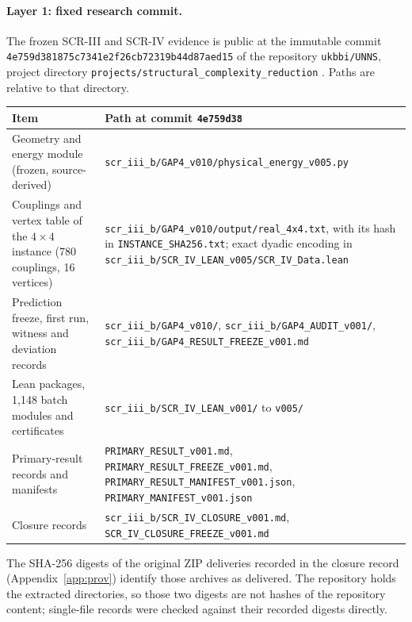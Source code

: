 \documentclass[11pt,a4paper]{article}
\theoremstyle{plain}
\theoremstyle{definition}
\theoremstyle{remark}
\newcommand{\lean}[1]{\nolinkurl{#1}}
\begin{document}
\paragraph{Layer 1: fixed research commit.} The frozen SCR-III and SCR-IV evidence is public at the immutable commit \texttt{4e759d381875c7341e2f26cb72319b44d87aed15} of the repository \texttt{ukbbi/UNNS}, project directory \lean{projects/structural_complexity_reduction} \cite{UNNSRepo2026}. Paths are relative to that directory.
\begin{center}\small
\begin{tabularx}{\linewidth}{@{}p{4.1cm}X@{}}
\toprule
Item & Path at commit \texttt{4e759d38}\\
\midrule
Geometry and energy module (frozen, source-derived) & \lean{scr_iii_b/GAP4_v010/physical_energy_v005.py}\\
Couplings and vertex table of the $4\times4$ instance (780 couplings, 16 vertices) & \lean{scr_iii_b/GAP4_v010/output/real_4x4.txt}, with its hash in \lean{INSTANCE_SHA256.txt}; exact dyadic encoding in \lean{scr_iii_b/SCR_IV_LEAN_v005/SCR_IV_Data.lean}\\
Prediction freeze, first run, witness and deviation records & \lean{scr_iii_b/GAP4_v010/}, \lean{scr_iii_b/GAP4_AUDIT_v001/}, \lean{scr_iii_b/GAP4_RESULT_FREEZE_v001.md}\\
Lean packages, 1{,}148 batch modules and certificates & \lean{scr_iii_b/SCR_IV_LEAN_v001/} to \lean{v005/}\\
Primary-result records and manifests & \lean{PRIMARY_RESULT_v001.md}, \lean{PRIMARY_RESULT_FREEZE_v001.md}, \lean{PRIMARY_RESULT_MANIFEST_v001.json}, \lean{PRIMARY_MANIFEST_v001.json}\\
Closure records & \lean{scr_iii_b/SCR_IV_CLOSURE_v001.md}, \lean{SCR_IV_CLOSURE_FREEZE_v001.md}\\
\bottomrule
\end{tabularx}
\end{center}
The SHA-256 digests of the original ZIP deliveries recorded in the closure record (Appendix~\ref{app:prov}) identify those archives as delivered. The repository holds the extracted directories, so those two digests are not hashes of the repository content; single-file records were checked against their recorded digests directly.
\end{document}
